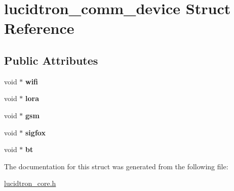\hypertarget{structlucidtron__comm__device}{}\section{lucidtron\+\_\+comm\+\_\+device Struct Reference}
\label{structlucidtron__comm__device}
\subsection*{Public Attributes}
\begin{DoxyCompactItemize}
\item 
void $\ast$ {\bfseries wifi}\hypertarget{structlucidtron__comm__device_a32df7d53aa6ff10dd5442738421f3d61}{}\label{structlucidtron__comm__device_a32df7d53aa6ff10dd5442738421f3d61}

\item 
void $\ast$ {\bfseries lora}\hypertarget{structlucidtron__comm__device_aa0f4a00e72e7dadc08f2f178180355b6}{}\label{structlucidtron__comm__device_aa0f4a00e72e7dadc08f2f178180355b6}

\item 
void $\ast$ {\bfseries gsm}\hypertarget{structlucidtron__comm__device_a8c92bd7efb5c408205459e3c23f4210e}{}\label{structlucidtron__comm__device_a8c92bd7efb5c408205459e3c23f4210e}

\item 
void $\ast$ {\bfseries sigfox}\hypertarget{structlucidtron__comm__device_a92d72e6695e022d9ea91a4a4dc09da32}{}\label{structlucidtron__comm__device_a92d72e6695e022d9ea91a4a4dc09da32}

\item 
void $\ast$ {\bfseries bt}\hypertarget{structlucidtron__comm__device_ae93d8d5b127d37e4c53c083de54c4d02}{}\label{structlucidtron__comm__device_ae93d8d5b127d37e4c53c083de54c4d02}

\end{DoxyCompactItemize}


The documentation for this struct was generated from the following file\+:\begin{DoxyCompactItemize}
\item 
\hyperlink{lucidtron__core_8h}{lucidtron\+\_\+core.\+h}\end{DoxyCompactItemize}
